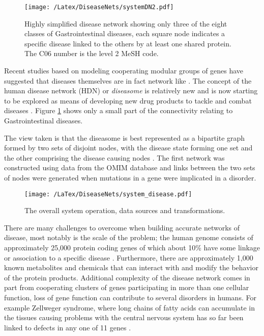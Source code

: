 \documentclass[authoryear,10pt,preprint]{elsarticle}
\begin{document}
\begin{figure}[h]
  \begin{center}
 \texttt{[image: /Latex/DiseaseNets/systemDN2.pdf]} %
  \end{center}
 \caption{Highly simplified disease network showing only three of the eight classes of Gastrointestinal diseases, each square node indicates a specific disease linked to the others by at least one shared protein. The C06 number is the level 2 MeSH code.}
\label{small_net}
\end{figure}

Recent studies based on modeling cooperating modular groups of genes have suggested that diseases themselves are in fact network like \citep{BauerM2011,Barrenas2009}. The concept of the human disease network (HDN) or \emph{diseasome} is relatively new and is now starting to be explored as means of developing new drug products to tackle and combat diseases \citep{He2011,Hu2009}.  Figure \ref{small_net} shows only a small part of the connectivity relating to Gastrointestinal diseases. 

The view taken is that the diseasome is best represented as a bipartite graph formed by two sets of disjoint nodes, with the disease state forming one set and the other comprising the disease causing nodes \citep{GohKI2012}. The first network was constructed using data from the OMIM database and  links between the two sets of nodes were generated when mutations in a gene were implicated in a disorder\citep{Goh2007}.

\begin{figure*}[ht]
  \begin{center}
 \texttt{[image: /LaTex/DiseaseNets/system\_disease.pdf]} %
  \end{center}
 \caption{The overall system operation, data sources and transformations.}
\label{system}
\end{figure*}

There are many challenges to overcome when building accurate networks of disease,  most notably is the scale of the problem; the human genome consists of approximately 25,000 protein coding genes of which about 10\% have some linkage or association to a specific disease \citep{Barabasi2011}. Furthermore, there are approximately 1,000 known metabolites and chemicals that can interact with and modify the behavior of the protein products.  Additional complexity of the disease network comes in part from cooperating clusters of genes participating in more than one cellular function, loss of gene function can contribute to several disorders in humans. For example Zellweger syndrome, where long chains of fatty acids can accumulate in the tissues causing problems with the central nervous system has so far been linked to defects in any one of 11 genes \citep{Wanders04}. 
\end{document}
